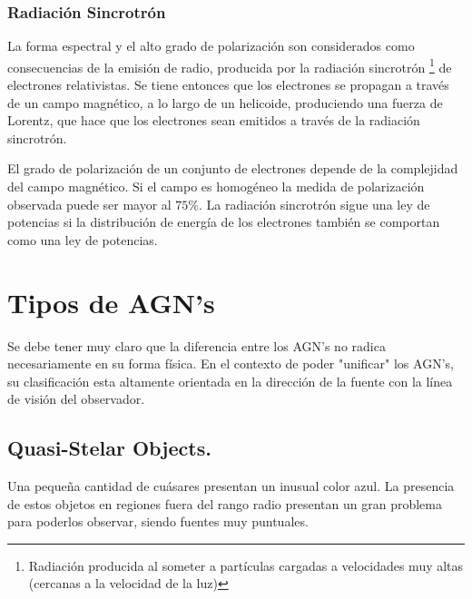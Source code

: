 	\subsubsection{Radiación Sincrotrón}
	\label{subsubsec: Radiation_synchrotron}

La forma espectral y el alto grado de polarización son considerados como consecuencias de la emisión de radio, producida por la radiación sincrotrón \footnote{Radiación producida al someter a partículas cargadas a velocidades muy altas (cercanas a la velocidad de la luz) } de electrones relativistas. Se tiene entonces que los electrones se propagan a través de un campo magnético, a lo largo de un helicoide, produciendo una fuerza de Lorentz, que hace que los electrones sean emitidos a través de la radiación sincrotrón. 

El grado de polarización de un conjunto de electrones depende de la complejidad del campo magnético. Si el campo es homogéneo la medida de polarización observada puede ser mayor al $75\%$. La radiación sincrotrón sigue una ley de potencias si la distribución de energía de los electrones también se comportan como una ley de potencias. 


\section{Tipos de AGN's}
\label{sec:Zoo_AGN's}

Se debe tener muy claro que la diferencia entre los AGN's no radica necesariamente en su forma física. En el contexto de poder "unificar"  los AGN's, su clasificación esta altamente orientada en la dirección de la fuente con la línea de visión del observador. 


	\subsection{Quasi-Stelar Objects.}
	\label{subsec:Quasi-Stelar_Objects}

Una pequeña cantidad de cuásares presentan un inusual color azul. La presencia de estos objetos en regiones fuera del rango radio presentan un gran problema para poderlos observar, siendo fuentes muy puntuales.

